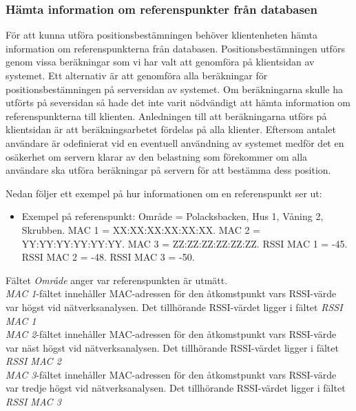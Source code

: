 \documentclass[a4paper,12pt]{article}
\begin{document}
 \subsubsection{Hämta information om referenspunkter från databasen}\label{HamtaInfoDB}
 För att kunna utföra positionsbestämningen behöver klientenheten hämta information om referenspunkterna från databasen. Positionsbestämningen utförs genom vissa beräkningar som vi har valt att genomföra på klientsidan av systemet. Ett alternativ är att genomföra alla beräkningar för positionsbestämningen på serversidan av systemet. Om beräkningarna skulle ha utförts på seversidan så hade det inte varit nödvändigt att hämta information om referenspunkterna till klienten. Anledningen till att beräkningarna utförs på klientsidan är att beräkningsarbetet fördelas på alla klienter. Eftersom antalet användare är odefinierat vid en eventuell användning av systemet medför det en osäkerhet om servern klarar av den belastning som förekommer om alla användare ska utföra beräkningar på servern för att bestämma dess position.


 Nedan följer ett exempel på hur informationen om en referenspunkt ser ut:
 \begin{itemize}
   \item Exempel på referenspunkt:
         \newline Område = Polacksbacken, Hus 1, Våning 2, Skrubben.
         \newline MAC 1 = XX:XX:XX:XX:XX:XX.
         \newline MAC 2 = YY:YY:YY:YY:YY:YY.
         \newline MAC 3 = ZZ:ZZ:ZZ:ZZ:ZZ:ZZ.
         \newline RSSI MAC 1 = -45.
         \newline RSSI MAC 2 = -48.
         \newline RSSI MAC 3 = -50.
 \end{itemize}


 Fältet \textit{Område} anger var referenspunkten är utmätt. \\
 \textit{MAC 1}-fältet innehåller MAC-adressen för den åtkomstpunkt vars RSSI-värde var högst vid nätverksanalysen. Det tillhörande RSSI-värdet ligger i fältet \textit{RSSI MAC 1}\\
  \textit{MAC 2}-fältet innehåller MAC-adressen för den åtkomstpunkt vars RSSI-värde var näst högst vid nätverksanalysen. Det tillhörande RSSI-värdet ligger i fältet \textit{RSSI MAC 2}\\
   \textit{MAC 3}-fältet innehåller MAC-adressen för den åtkomstpunkt vars RSSI-värde var tredje högst vid nätverksanalysen. Det tillhörande RSSI-värdet ligger i fältet \textit{RSSI MAC 3}\\
\end{document}
